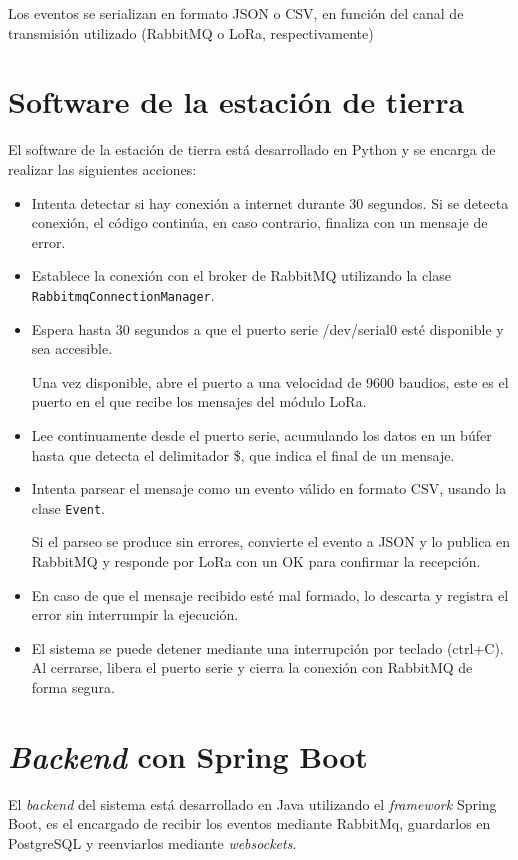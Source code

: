Los eventos se serializan en formato JSON o CSV, en función del canal de transmisión utilizado (RabbitMQ o LoRa, respectivamente)


\section{Software de la estación de tierra}

El software de la estación de tierra está desarrollado en Python y se encarga de realizar las siguientes acciones:

\begin{itemize}
    \item Intenta detectar si hay conexión a internet durante 30 segundos.
    Si se detecta conexión, el código continúa, en caso contrario, finaliza con un mensaje de error.
    \item Establece la conexión con el broker de RabbitMQ utilizando la clase \texttt{RabbitmqConnectionManager}.
    \item Espera hasta 30 segundos a que el puerto serie /dev/serial0 esté disponible y sea accesible.

    Una vez disponible, abre el puerto a una velocidad de 9600 baudios, este es el puerto en el que recibe los mensajes del módulo LoRa.
    \item Lee continuamente desde el puerto serie, acumulando los datos en un búfer hasta que detecta el delimitador \$, que indica el final de un mensaje.
    \item Intenta parsear el mensaje como un evento válido en formato CSV, usando la clase \texttt{Event}.

    Si el parseo se produce sin errores, convierte el evento a JSON y lo publica en RabbitMQ y responde por LoRa con un OK para confirmar la recepción.
    \item En caso de que el mensaje recibido esté mal formado, lo descarta y registra el error sin interrumpir la ejecución.
    \item El sistema se puede detener mediante una interrupción por teclado (ctrl+C). Al cerrarse, libera el puerto serie y cierra la conexión con RabbitMQ de forma segura.
\end{itemize}


\section{\emph{Backend} con Spring Boot}

El \emph{backend} del sistema está desarrollado en Java utilizando el \emph{framework} Spring Boot, es el encargado de recibir los eventos mediante RabbitMq, guardarlos en PostgreSQL y reenviarlos mediante \emph{websockets}.

